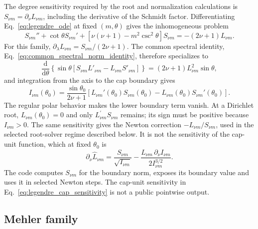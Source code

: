 ﻿\documentclass[11pt,a4paper]{article}
\newcommand{\dd}{\mathrm{d}}
\begin{document}
The degree sensitivity required by the root and normalization calculations is
$S_{\nu m}=\partial_\nu L_{\nu m}$, including the derivative of the Schmidt factor. Differentiating Eq.~\eqref{eq:legendre_ode} at fixed $(m,\theta)$ gives the inhomogeneous problem
\begin{equation}
 S_{\nu m}''+\cot\theta S_{\nu m}'
 +\left[\nu(\nu+1)-m^2\csc^2\theta\right]S_{\nu m}
 =-(2\nu+1)L_{\nu m}.
 \label{eq:legendre_sensitivity}
\end{equation}
For this family, $\partial_\lambda L_{\nu m}=S_{\nu m}/(2\nu+1)$. The common spectral identity, Eq.~\eqref{eq:common_spectral_norm_identity}, therefore specializes to
\begin{equation}
 \frac{\dd}{\dd\theta}\!\left\{\sin\theta
 \left[S_{\nu m}L'_{\nu m}-L_{\nu m}S'_{\nu m}\right]\right\}
 =(2\nu+1)L_{\nu m}^2\sin\theta,
 \label{eq:legendre_lagrange_identity}
\end{equation}
and integration from the axis to the cap boundary gives
\begin{equation}
 I_{\nu m}(\theta_0)
 =\frac{\sin\theta_0}{2\nu+1}
 \left[L_{\nu m}'(\theta_0)S_{\nu m}(\theta_0)
 -L_{\nu m}(\theta_0)S_{\nu m}'(\theta_0)\right].
 \label{eq:legendre_norm_identity}
\end{equation}
The regular polar behavior makes the lower boundary term vanish. At a Dirichlet root, $L_{\nu m}(\theta_0)=0$ and only $L_{\nu m}^{\prime}S_{\nu m}$ remains; its sign must be positive because $I_{\nu m}>0$. The same sensitivity gives the Newton correction $-L_{\nu m}/S_{\nu m}$, used in the selected root-solver regime described below. It is not the sensitivity of the cap-unit function, which at fixed $\theta_0$ is
\begin{equation}
 \partial_\nu\widehat L_{\nu m}
 =\frac{S_{\nu m}}{\sqrt{I_{\nu m}}}
 -\frac{L_{\nu m}\,\partial_\nu I_{\nu m}}{2I_{\nu m}^{3/2}}.
 \label{eq:legendre_cap_sensitivity}
\end{equation}
The code computes $S_{\nu m}$ for the boundary norm, exposes its boundary value and uses it in selected Newton steps. The cap-unit sensitivity in Eq.~\eqref{eq:legendre_cap_sensitivity} is not a public pointwise output.

\subsection{Mehler family}
\end{document}
